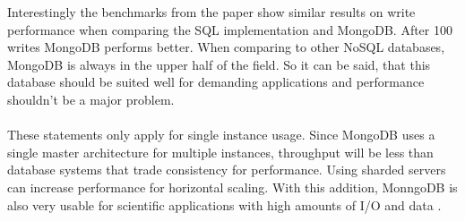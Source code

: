 Interestingly the benchmarks from the paper show similar results on write performance when comparing the SQL implementation and MongoDB. After 100 writes MongoDB performs better. When comparing to other NoSQL databases, MongoDB is always in the upper half of the field. So it can be said, that this database should be suited well for demanding applications and performance shouldn't be a major problem. 
\\\\
These statements only apply for single instance usage. Since MongoDB uses a single master architecture for multiple instances, throughput will be less than database systems that trade consistency for performance. Using sharded servers can increase performance for horizontal scaling. With this addition, MonngoDB is also very usable for scientific applications with high amounts of I/O and data \cite{Dede_Performance_2013}.



